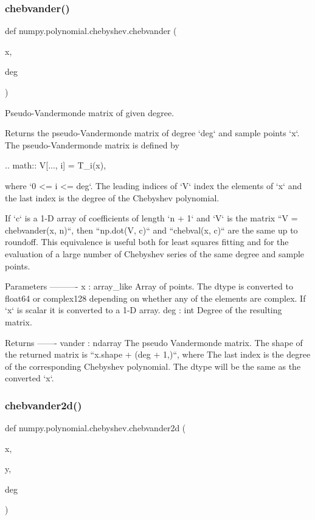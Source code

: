\subsubsection{\texorpdfstring{chebvander()}{chebvander()}}
{\footnotesize\ttfamily def numpy.\+polynomial.\+chebyshev.\+chebvander (\begin{DoxyParamCaption}\item[{}]{x,  }\item[{}]{deg }\end{DoxyParamCaption})}

\begin{DoxyVerb}Pseudo-Vandermonde matrix of given degree.

Returns the pseudo-Vandermonde matrix of degree `deg` and sample points
`x`. The pseudo-Vandermonde matrix is defined by

.. math:: V[..., i] = T_i(x),

where `0 <= i <= deg`. The leading indices of `V` index the elements of
`x` and the last index is the degree of the Chebyshev polynomial.

If `c` is a 1-D array of coefficients of length `n + 1` and `V` is the
matrix ``V = chebvander(x, n)``, then ``np.dot(V, c)`` and
``chebval(x, c)`` are the same up to roundoff.  This equivalence is
useful both for least squares fitting and for the evaluation of a large
number of Chebyshev series of the same degree and sample points.

Parameters
----------
x : array_like
    Array of points. The dtype is converted to float64 or complex128
    depending on whether any of the elements are complex. If `x` is
    scalar it is converted to a 1-D array.
deg : int
    Degree of the resulting matrix.

Returns
-------
vander : ndarray
    The pseudo Vandermonde matrix. The shape of the returned matrix is
    ``x.shape + (deg + 1,)``, where The last index is the degree of the
    corresponding Chebyshev polynomial.  The dtype will be the same as
    the converted `x`.\end{DoxyVerb}
 \mbox{\label{namespacenumpy_1_1polynomial_1_1chebyshev_a21a06d01240e81ecfacfb886a19a20e8}} 
\subsubsection{\texorpdfstring{chebvander2d()}{chebvander2d()}}
{\footnotesize\ttfamily def numpy.\+polynomial.\+chebyshev.\+chebvander2d (\begin{DoxyParamCaption}\item[{}]{x,  }\item[{}]{y,  }\item[{}]{deg }\end{DoxyParamCaption})}

